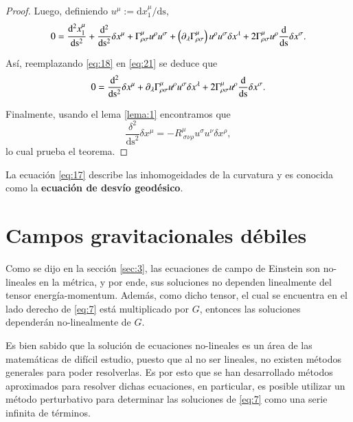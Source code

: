 \begin{proof}
Luego, definiendo $u^{\mu} := \mathrm{d} x^{\mu}_1 / \mathrm{ds}$,
\begin{equation}
\label{eq:21}
0 = \dv[2]{x_1^{\mu}}{\mathrm{s}} + \dv[2]{ }{\mathrm{s}} \delta x^{\mu} + \Gamma^{\mu}_{\rho \sigma} u^{\rho} u^{\sigma} + \left( \partial_{\lambda} \Gamma^{\mu}_{\rho \sigma} \right) u^{\rho} u^{\sigma} \delta x^{\lambda} + 2 \Gamma^{\mu}_{\rho \sigma} u^{\rho} \dv{ }{\mathrm{s}} \delta x^{\sigma}. 
\end{equation}

Así, reemplazando \eqref{eq:18} en \eqref{eq:21} se deduce que
\begin{equation}
0 = \dv[2]{ }{\mathrm{s}} \delta x^{\mu} + \partial_{\lambda} \Gamma^{\mu}_{\rho \sigma} u^{\rho} u^{\sigma} \delta x^{\lambda} + 2 \Gamma^{\mu}_{\rho \sigma} u^{\rho} \dv{ }{\mathrm{s}} \delta x^{\sigma}.
\end{equation}

Finalmente, usando el lema \ref{lema:1} encontramos que
\begin{equation}
\frac{\delta^2}{\mathrm{ds}^2}\delta x^{\mu} = - R^{\mu}_{\ \sigma \nu \rho} u^{\sigma} u^{\nu} \delta x^{\rho},
\end{equation}
lo cual prueba el teorema.
\end{proof}

La ecuación \eqref{eq:17} describe las inhomogeidades de la curvatura y es conocida como la \textbf{ecuación de desvío geodésico}.

\section{Campos gravitacionales débiles}

Como se dijo en la sección \ref{sec:3}, las ecuaciones de campo de Einstein son no-lineales en la métrica, y por ende, sus soluciones no dependen linealmente del tensor energía-momentum. Además, como dicho tensor, el cual se encuentra en el lado derecho de \eqref{eq:7} está multiplicado por $G$, entonces las soluciones dependerán no-linealmente de $G$.

Es bien sabido que la solución de ecuaciones no-lineales es un área de las matemáticas de difícil estudio, puesto que al no ser lineales, no existen métodos generales para poder resolverlas. Es por esto que se han desarrollado métodos aproximados para resolver dichas ecuaciones, en particular, es posible utilizar un método perturbativo para determinar las soluciones de \eqref{eq:7} como una serie infinita de términos.

